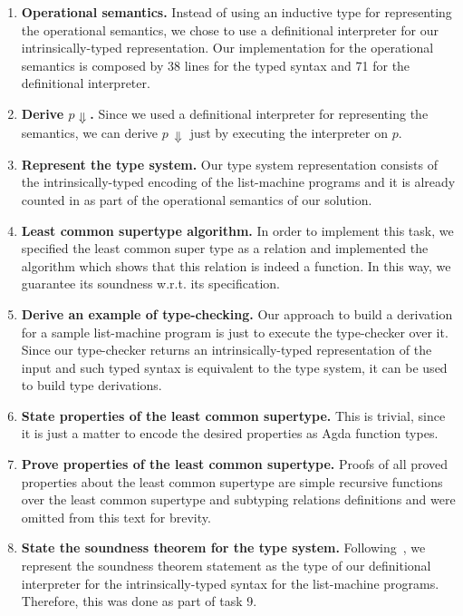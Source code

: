 \documentclass[review]{elsarticle}
\theoremstyle{definition}
\begin{document}
\begin{enumerate}
  \item \textbf{Operational semantics.} Instead of using an inductive type for representing the operational semantics, we chose to
        use a definitional interpreter for our intrinsically-typed representation. Our implementation for the operational
        semantics is composed by 38 lines for the typed syntax and 71 for the definitional interpreter.
  \item \textbf{Derive $p \Downarrow$.} Since we used a definitional interpreter for representing the semantics, we can derive
        $p\,\Downarrow$ just by executing the interpreter on $p$.
  \item \textbf{Represent the type system.} Our type system representation consists of the intrinsically-typed encoding of
        the list-machine programs and it is already counted in as part of the operational semantics of our solution.
      \item \textbf{Least common supertype algorithm.} In order to implement this task, we specified the least common super type
        as a relation and implemented the algorithm which shows that this relation is indeed a function. In this way, we
        guarantee its soundness w.r.t. its specification.
  \item \textbf{Derive an example of type-checking.} Our approach to build a derivation for a sample list-machine program
        is just to execute the type-checker over it. Since our type-checker returns an intrinsically-typed representation of
        the input and such typed syntax is equivalent to the type system, it can be used to build type derivations.
  \item \textbf{State properties of the least common supertype.} This is trivial, since it is just a matter to encode the
        desired properties as Agda function types.
  \item \textbf{Prove properties of the least common supertype.} Proofs of all proved properties about the least common supertype
        are simple recursive functions over the least common supertype and subtyping relations definitions and were omitted
        from this text for brevity.
  \item \textbf{State the soundness theorem for the type system.} Following~\cite{Amin17}, we represent the soundness
        theorem statement as the type of our definitional interpreter for the intrinsically-typed syntax for the list-machine
        programs. Therefore, this was done as part of task 9.

\end{enumerate}
\end{document}
